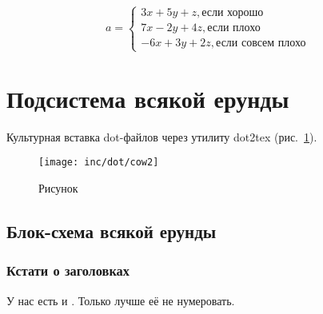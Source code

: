 \begin{equation}
    a= \begin{cases}
           3x + 5y + z, \mbox{если хорошо} \\
           7x - 2y + 4z, \mbox{если плохо}\\
           -6x + 3y + 2z, \mbox{если совсем плохо}
    \end{cases}
    \label{F:F2}
\end{equation}

\section{Подсистема всякой ерунды}

Культурная вставка dot-файлов через утилиту dot2tex (рис.~\ref{fig:fig02}).

\begin{figure}
    \centering
    \texttt{[image: inc/dot/cow2]}
    \caption{Рисунок}
    \label{fig:fig02}
\end{figure}


\subsection{Блок-схема всякой ерунды}

\subsubsection*{Кстати о заголовках}

У нас есть и . Только лучше её не нумеровать.

